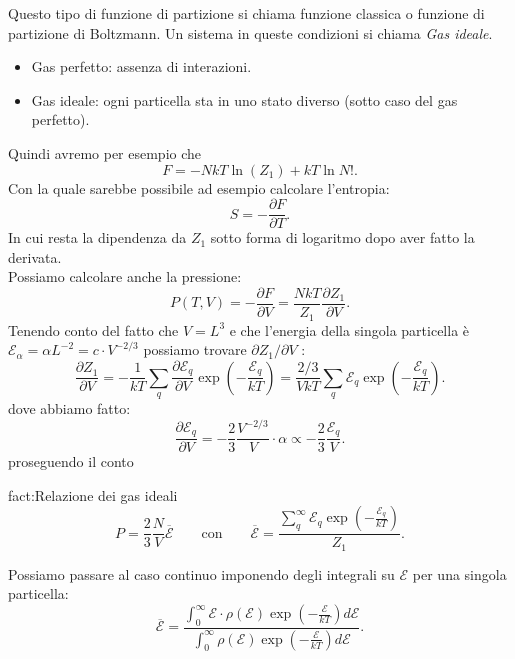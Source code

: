 Questo tipo di funzione di partizione si chiama funzione classica o funzione di partizione di Boltzmann. Un sistema in queste condizioni si chiama \textit{Gas ideale}.
\begin{itemize}
	\item Gas perfetto: assenza di interazioni.
	\item Gas ideale: ogni particella sta in uno stato diverso (sotto caso del gas perfetto).
\end{itemize} \label{def:gas-ideale}
Quindi avremo per esempio che
\[
	F = -NkT \ln \left( Z_1 \right) + kT \ln N!
.\] 
Con la quale sarebbe possibile ad esempio calcolare l'entropia:
\[
	S = - \frac{\partial F}{\partial T} 
.\] 
In cui resta la dipendenza da $Z_1$ sotto forma di logaritmo dopo aver fatto la derivata.\\
Possiamo calcolare anche la pressione:
\[
	P\left( T,V \right) = - \frac{\partial F}{\partial V} = \frac{NkT}{Z_1} \frac{\partial Z_1}{\partial V} 
.\] 
Tenendo conto del fatto che $V = L^3$ e che l'energia della singola particella è $\mathcal{E}_{\alpha}= \alpha L^{-2} = c \cdot V^{-2 /3}$ possiamo trovare $\partial Z_1 /\partial V $ :
\[
	\frac{\partial Z_1}{\partial V}  = - \frac{1}{kT}\sum_{q}^{} \frac{\partial \mathcal{E}_{q}}{\partial V} \exp\left( - \frac{\mathcal{E}_{q}}{kT} \right) = 
	\frac{2 /3}{VkT} \sum_{q}^{} \mathcal{E}_{q}\exp\left( -\frac{\mathcal{E}_{q}}{kT} \right) 
.\] 
dove abbiamo fatto:
\[
    \frac{\partial \mathcal{E}_{q}}{\partial V} = -\frac{2}{3}\frac{V^{-2 /3}}{V}\cdot \alpha \propto -\frac{2}{3}\frac{\mathcal{E}_{q}}{V} 
.\] 
proseguendo il conto
\begin{fact}{fact:Relazione dei gas ideali}
\[
	P = \frac{2}{3}\frac{N}{V}\overline{\mathcal{E}} \quad \quad \text{con} \quad \quad \overline{\mathcal{E}} = \frac{\sum_{q}^{\infty} \mathcal{E}_{q}\exp\left( - \frac{\mathcal{E}_{q}}{kT} \right) }{Z_1}
.\] 
\end{fact}
Possiamo passare al caso continuo  imponendo degli integrali su $\mathcal{E}$ per una singola particella:
\[
	\overline{\mathcal{E}} = \frac{\int_{0}^{\infty} \mathcal{E}\cdot  \rho\left( \mathcal{E} \right) \exp\left( -\frac{\mathcal{E}}{kT} \right) d\mathcal{E}}{\int_{0}^{\infty}\rho\left( \mathcal{E} \right) \exp \left( -\frac{\mathcal{E}}{kT} \right) d\mathcal{E}}
.\] 

